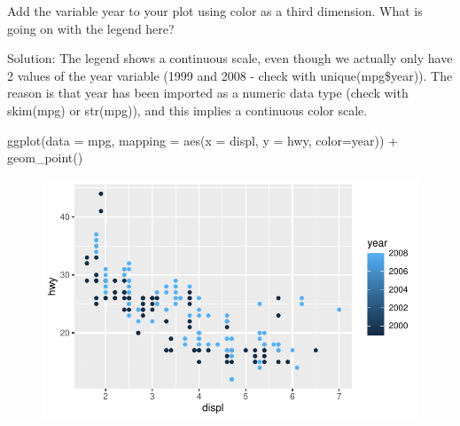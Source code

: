\documentclass[
  letterpaper,
  DIV=11,
  numbers=noendperiod]{scrartcl}
\newenvironment{Shaded}{\begin{snugshade}}{\end{snugshade}}
\newcommand{\AttributeTok}[1]{\textcolor[rgb]{0.40,0.45,0.13}{#1}}
\newcommand{\FunctionTok}[1]{\textcolor[rgb]{0.28,0.35,0.67}{#1}}
\newcommand{\NormalTok}[1]{\textcolor[rgb]{0.00,0.23,0.31}{#1}}
\newcommand{\SpecialCharTok}[1]{\textcolor[rgb]{0.37,0.37,0.37}{#1}}
\begin{document}
Add the variable year to your plot using color as a third dimension.
What is going on with the legend here?

Solution: The legend shows a continuous scale, even though we actually
only have 2 values of the year variable (1999 and 2008 - check with
unique(mpg\$year)). The reason is that year has been imported as a
numeric data type (check with skim(mpg) or str(mpg)), and this implies a
continuous color scale.

\begin{Shaded}
\begin{Highlighting}[]
\FunctionTok{ggplot}\NormalTok{(}\AttributeTok{data =}\NormalTok{ mpg, }
       \AttributeTok{mapping =} \FunctionTok{aes}\NormalTok{(}\AttributeTok{x =}\NormalTok{ displ, }
                     \AttributeTok{y =}\NormalTok{ hwy,}
                     \AttributeTok{color=}\NormalTok{year)) }\SpecialCharTok{+}
  \FunctionTok{geom\_point}\NormalTok{()}
\end{Highlighting}
\end{Shaded}

\begin{figure}[H]

{\centering \includegraphics{Part1_Lecture1_Ex_files/figure-pdf/unnamed-chunk-29-1.pdf}

}

\end{figure}

\begin{Shaded}
\end{Shaded}
\end{document}
